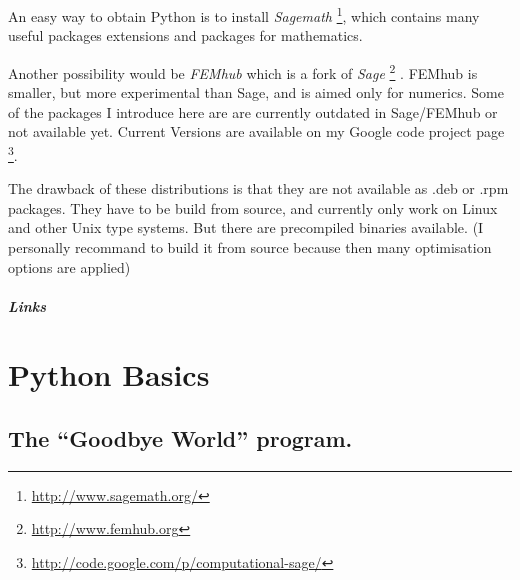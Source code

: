 \documentclass[letterpaper,10pt,english]{manual}
\begin{document}
An easy way to obtain Python is to install \emph{Sagemath} \footnote{
\href{http://www.sagemath.org/}{http://www.sagemath.org/}
}, which contains many useful packages extensions
and packages for mathematics.

Another possibility would be \emph{FEMhub} which is a fork of \emph{Sage} \footnote{
\href{http://www.femhub.org}{http://www.femhub.org}
} . FEMhub is smaller, but more experimental than
Sage, and is aimed only for numerics.
Some of the packages I introduce here are are currently outdated in Sage/FEMhub or not available yet. Current Versions are
available on my Google code project page \footnote{
\href{http://code.google.com/p/computational-sage/}{http://code.google.com/p/computational-sage/}
}.

The drawback of these distributions is that they are not available as .deb or .rpm packages. They have to be build
from source, and currently only work on Linux and other Unix type systems.
But there are precompiled binaries available. (I personally recommand to
build it from source because then many optimisation options are applied)
\paragraph{Links}

\resetcurrentobjects
\hypertarget{--doc-Steps}{}

\hypertarget{basics-ref}{}\chapter{Python Basics}


\section{The ``Goodbye World'' program.}
\end{document}
